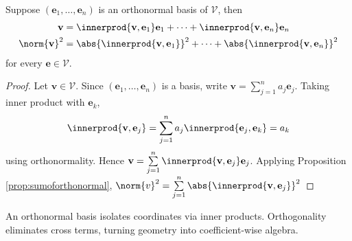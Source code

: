 \begin{theorem} \label{thm:orthonormalbasisinnerprod} Suppose $(\mathbf{e}_1, \ldots, \mathbf{e}_n)$ is an orthonormal basis of $\mathcal{V}$, then
\begin{align}
\mathbf{v} &= \innerprod{\mathbf{v}, \mathbf{e}_1}\mathbf{e}_1 + \cdots + \innerprod{\mathbf{v}, \mathbf{e}_n}\mathbf{e}_n \nonumber \\
\norm{\mathbf{v}}^2 &= \abs{\innerprod{\mathbf{v}, \mathbf{e}_1}}^2 + \cdots + \abs{\innerprod{\mathbf{v}, \mathbf{e}_n}}^2 \nonumber
\end{align}
for every $\mathbf{e} \in \mathcal{V}$.
\begin{proof} Let $\mathbf{v} \in \mathcal{V}$. Since $(\mathbf{e}_1, \ldots, \mathbf{e}_n)$ is a basis, write $\mathbf{v} = \sum\limits_{j=1}^n a_j \mathbf{e}_j$. Taking inner product with $\mathbf{e}_k$,
\begin{align}
\innerprod{\mathbf{v}, \mathbf{e}_j} = \sum\limits_{j=1}^n a_j \innerprod{\mathbf{e}_j, \mathbf{e}_k} = a_k \nonumber
\end{align}
using orthonormality. Hence $\mathbf{v} = \sum\limits_{j=1}^n \innerprod{\mathbf{v}, \mathbf{e}_j} \mathbf{e}_j$. Applying Proposition \ref{prop:sumoforthonormal}, $\norm{v}^2 = \sum\limits_{j=1}^n \abs{\innerprod{\mathbf{v}, \mathbf{e}_j}}^2$
\end{proof}
\end{theorem}

An orthonormal basis isolates coordinates via inner products. Orthogonality eliminates cross terms, turning geometry into coefficient-wise algebra.

